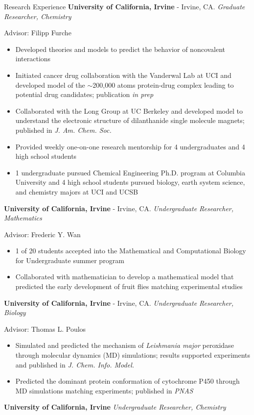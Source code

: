 \begin{rubric}{Research Experience}
%
  \textbf{University of California, Irvine} - Irvine, CA.
  \textit{Graduate Researcher, Chemistry}
  
  Advisor: Filipp Furche
  \vspace{-0.5em}
  \begin{itemize}
    \itemsep-0.5em
  \item Developed theories and models to predict the behavior of noncovalent interactions
  \item Initiated cancer drug collaboration with the Vanderwal Lab at UCI and developed model of
    the $\sim$200,000 atoms protein-drug complex leading to potential drug candidates; publication \textit{in prep}
  \item Collaborated with the Long Group at UC Berkeley and developed model to understand the electronic
    structure of dilanthanide single molecule magnets; published in \textit{J. Am. Chem. Soc.}
  \item Provided weekly one-on-one research mentorship for 4 undergraduates %
    and 4 high school students %
  \item 1 undergraduate pursued Chemical Engineering Ph.D. program at Columbia University and
    4 high school students pursued biology, earth system science, and chemistry majors at UCI
    and UCSB
  \end{itemize}
  \textbf{University of California, Irvine} - Irvine, CA.
  \textit{Undergraduate Researcher, Mathematics}

  Advisor: Frederic Y. Wan
  \vspace{-0.5em}
  \begin{itemize}
  \itemsep-0.5em
  \item 1 of 20 students accepted into the Mathematical and Computational Biology for Undergraduate
    summer program
  \item Collaborated with mathematician to develop a mathematical model that predicted the early
    development of fruit flies matching experimental studies
  \end{itemize}
  \textbf{University of California, Irvine} - Irvine, CA.
  \textit{Undergraduate Researcher, Biology}

  Advisor: Thomas L. Poulos
  \vspace{-0.5em}
  \begin{itemize}
  \itemsep-0.5em
  \item Simulated and predicted the mechanism of \textit{Leishmania major} peroxidase through
    molecular dynamics (MD) simulations; results supported experiments and published in
    \textit{J. Chem. Info. Model.}
  \item Predicted the dominant protein conformation of cytochrome P450 through
    MD simulations matching experiments; published in \textit{PNAS}
  \end{itemize}
  \textbf{University of California, Irvine}
  \textit{Undergraduate Researcher, Chemistry}


\end{rubric}
